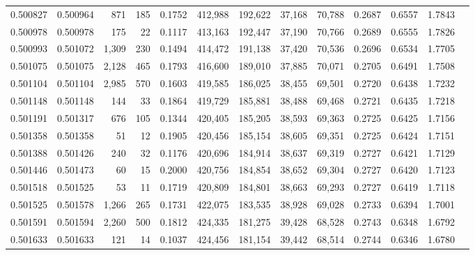 \begin{tabular}{rrrrrrrrrrrrr}
0.500827 & 0.500964 &   871 &   185 &                                     0.1752 & 412,988 & 192,622 &  37,168 &  70,788 & 0.2687 & 0.6557 & 1.7843 \\
0.500978 & 0.500978 &   175 &    22 &                                     0.1117 & 413,163 & 192,447 &  37,190 &  70,766 & 0.2689 & 0.6555 & 1.7826 \\
0.500993 & 0.501072 & 1,309 &   230 &                                     0.1494 & 414,472 & 191,138 &  37,420 &  70,536 & 0.2696 & 0.6534 & 1.7705 \\
0.501075 & 0.501075 & 2,128 &   465 &                                     0.1793 & 416,600 & 189,010 &  37,885 &  70,071 & 0.2705 & 0.6491 & 1.7508 \\
0.501104 & 0.501104 & 2,985 &   570 &                                     0.1603 & 419,585 & 186,025 &  38,455 &  69,501 & 0.2720 & 0.6438 & 1.7232 \\
0.501148 & 0.501148 &   144 &    33 &                                     0.1864 & 419,729 & 185,881 &  38,488 &  69,468 & 0.2721 & 0.6435 & 1.7218 \\
0.501191 & 0.501317 &   676 &   105 &                                     0.1344 & 420,405 & 185,205 &  38,593 &  69,363 & 0.2725 & 0.6425 & 1.7156 \\
0.501358 & 0.501358 &    51 &    12 &                                     0.1905 & 420,456 & 185,154 &  38,605 &  69,351 & 0.2725 & 0.6424 & 1.7151 \\
0.501388 & 0.501426 &   240 &    32 &                                     0.1176 & 420,696 & 184,914 &  38,637 &  69,319 & 0.2727 & 0.6421 & 1.7129 \\
0.501446 & 0.501473 &    60 &    15 &                                     0.2000 & 420,756 & 184,854 &  38,652 &  69,304 & 0.2727 & 0.6420 & 1.7123 \\
0.501518 & 0.501525 &    53 &    11 &                                     0.1719 & 420,809 & 184,801 &  38,663 &  69,293 & 0.2727 & 0.6419 & 1.7118 \\
0.501525 & 0.501578 & 1,266 &   265 &                                     0.1731 & 422,075 & 183,535 &  38,928 &  69,028 & 0.2733 & 0.6394 & 1.7001 \\
0.501591 & 0.501594 & 2,260 &   500 &                                     0.1812 & 424,335 & 181,275 &  39,428 &  68,528 & 0.2743 & 0.6348 & 1.6792 \\
0.501633 & 0.501633 &   121 &    14 &                                     0.1037 & 424,456 & 181,154 &  39,442 &  68,514 & 0.2744 & 0.6346 & 1.6780 \\

\end{tabular}
